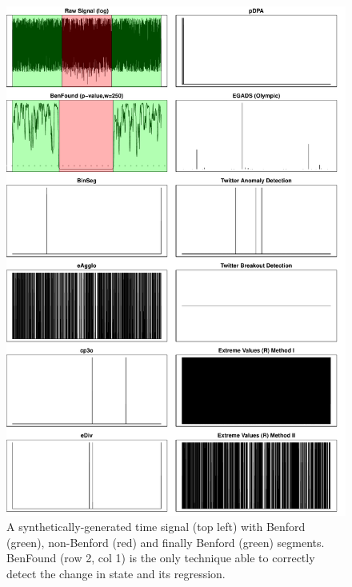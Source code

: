 \documentclass[twoside,leqno,twocolumn]{article}\usepackage[]{graphicx}\usepackage[]{color}
\makeatletter
\def\maxwidth{ %
  \ifdim\Gin@nat@width>\linewidth
    \linewidth
  \else
    \Gin@nat@width
  \fi
}
\newenvironment{knitrout}{}{} %
\makeatother
\begin{document}
\begin{knitrout}
\color{fgcolor}\begin{figure}[h!]
\includegraphics[width=\maxwidth]{figure/synthetic-experiments-1} \caption[A synthetically-generated time signal (top left) with Benford (green), non-Benford (red) and finally Benford (green) segments]{A synthetically-generated time signal (top left) with Benford (green), non-Benford (red) and finally Benford (green) segments. BenFound (row 2, col 1) is the only technique able to correctly detect the change in state and its regression.}\label{fig:synthetic-experiments}
\end{figure}


\end{knitrout}
\end{document}
